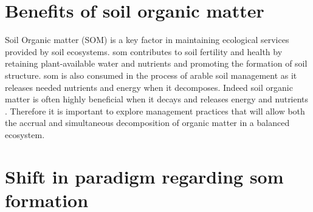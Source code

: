 
\section{Benefits of soil organic matter}


	Soil Organic matter (SOM) is a key factor in maintaining ecological services provided by soil ecosystems.
	\gls{som} contributes to soil fertility and health by retaining plant-available water and nutrients and promoting the formation of soil structure. \gls{som} is also consumed in the process of arable soil management as it releases needed nutrients and energy when it decomposes. Indeed soil organic matter is often highly beneficial when it decays and releases energy and nutrients \citep{lehmann2015, janzen2006}. Therefore it is important to explore  management practices that will allow both the accrual and simultaneous  decomposition of organic matter in a balanced ecosystem.

\section{Shift in paradigm regarding \gls{som} formation}

